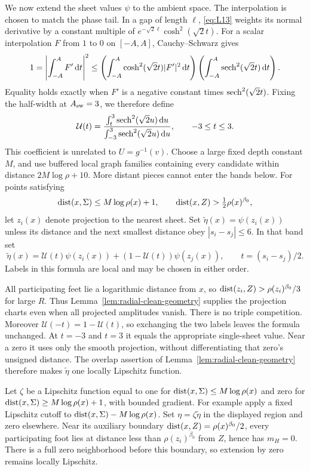 We now extend the sheet values $\psi$ to the ambient space. The interpolation is chosen to match the phase tail. In a gap of length $\ell$, \eqref{eq:L13} weights its normal derivative by a constant multiple of $e^{-\sqrt2\ell}\cosh^2(\sqrt2t)$. For a scalar interpolation $F$ from $1$ to $0$ on $[-A,A]$, Cauchy--Schwarz gives
\[
 1=\left|\int_{-A}^{A}F'\,\mathrm d t\right|^2
 \le\left(\int_{-A}^{A}\cosh^2(\sqrt2t)|F'|^2\,\mathrm d t\right)
       \left(\int_{-A}^{A}\operatorname{sech}^2(\sqrt2t)\,\mathrm d t\right).
\]
Equality holds exactly when $F'$ is a negative constant times $\operatorname{sech}^2(\sqrt2t)$. Fixing the half-width at $A_{\rm sw}=3$, we therefore define
\begin{equation}\label{eq:radial-interpolant}
 \mathcal U(t)=
 \frac{\int_t^{3}\operatorname{sech}^2(\sqrt2u)\,\mathrm d u}
      {\int_{-3}^{3}\operatorname{sech}^2(\sqrt2u)\,\mathrm d u},\qquad -3\le t\le3.
\end{equation}
This coefficient is unrelated to $U=g^{-1}(v)$. Choose a large fixed depth constant $M$, and use buffered local graph families containing every candidate within distance $2M\log\rho+10$. More distant pieces cannot enter the bands below. For points satisfying
\[
 \operatorname{dist}(x,\Sigma)\le M\log\rho(x)+1,
 \qquad \operatorname{dist}(x,Z)>\tfrac12\rho(x)^{\beta_0},
\]
let $z_i(x)$ denote projection to the nearest sheet. Set
$\widetilde\eta(x)=\psi(z_i(x))$ unless its distance and the next smallest distance obey $|s_i-s_j|\le6$. In that band set
\begin{equation}\label{eq:radial-ambient-amplitude}
 \widetilde\eta(x)=\mathcal U(t)\psi(z_i(x))+
                  (1-\mathcal U(t))\psi(z_j(x)),
 \qquad t=(s_i-s_j)/2.
\end{equation}
Labels in this formula are local and may be chosen in either order.

All participating feet lie a logarithmic distance from $x$, so
$\operatorname{dist}(z_i,Z)>\rho(z_i)^{\beta_0}/3$ for large $R$. Thus
Lemma~\ref{lem:radial-clean-geometry} supplies the projection charts even when all projected amplitudes vanish. There is no triple competition.
Moreover $\mathcal U(-t)=1-\mathcal U(t)$, so exchanging the two labels leaves the formula unchanged. At $t=-3$ and $t=3$ it equals the appropriate single-sheet value. Near a zero it uses only the smooth projection, without differentiating that zero's unsigned distance. The overlap assertion of Lemma~\ref{lem:radial-clean-geometry} therefore makes $\widetilde\eta$ one locally Lipschitz function.

Let $\zeta$ be a Lipschitz function equal to one for
$\operatorname{dist}(x,\Sigma)\le M\log\rho(x)$ and zero for
$\operatorname{dist}(x,\Sigma)\ge M\log\rho(x)+1$, with bounded gradient. For example apply a fixed Lipschitz cutoff to
$\operatorname{dist}(x,\Sigma)-M\log\rho(x)$. Set $\eta=\zeta\widetilde\eta$ in the displayed region and zero elsewhere. Near its auxiliary boundary
$\operatorname{dist}(x,Z)=\rho(x)^{\beta_0}/2$, every participating foot lies at distance less than $\rho(z_i)^{\beta_0}$ from $Z$, hence has $m_H=0$. There is a full zero neighborhood before this boundary, so extension by zero remains locally Lipschitz.

